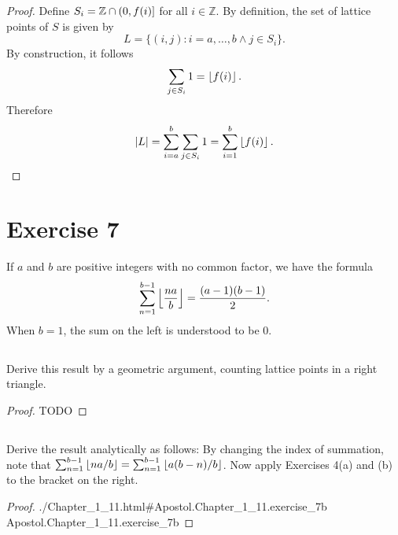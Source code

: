 \documentclass{article}
\newcommand{\lean}[1]{\leanref
  {./Chapter\_1\_11.html\#Apostol.Chapter\_1\_11.#1}
  {Apostol.Chapter\_1\_11.#1}}
\begin{document}
\begin{proof}

  Define $S_i = \mathbb{Z} \cap \left(0, f(i)\right]$ for all $i \in \mathbb{Z}$.
  By definition, the set of lattice points of $S$ is given by
    $$L = \{ (i, j) : i = a, \ldots, b \land j \in S_i \}.$$
  By construction, it follows $$\sum_{j \in S_i} 1 = \left\lfloor f(i)\right\rfloor.$$
  Therefore $$\left|L\right|
    = \sum_{i=a}^b \sum_{j \in S_i} 1
    = \sum_{i=1}^b \left\lfloor f(i)\right\rfloor.$$

\end{proof}

\section*{Exercise 7}%
%

If $a$ and $b$ are positive integers with no common factor, we have the formula
  $$\sum_{n=1}^{b-1} \left\lfloor\frac{na}{b}\right\rfloor = \frac{(a - 1)(b - 1)}{2}.$$
When $b = 1$, the sum on the left is understood to be $0$.

\subsection*{}%
%

Derive this result by a geometric argument, counting lattice points in a right
  triangle.

\begin{proof}

  TODO

\end{proof}

\subsection*{}%
%

Derive the result analytically as follows:
By changing the index of summation, note that
  $\sum_{n=1}^{b-1} \left\lfloor na / b\right\rfloor = \sum_{n=1}^{b-1} \left\lfloor a(b - n) / b\right\rfloor$.
Now apply Exercises 4(a) and (b) to the bracket on the right.

\begin{proof}

  \lean{exercise\_7b}

\end{proof}

\section*{}%
%
\end{document}
